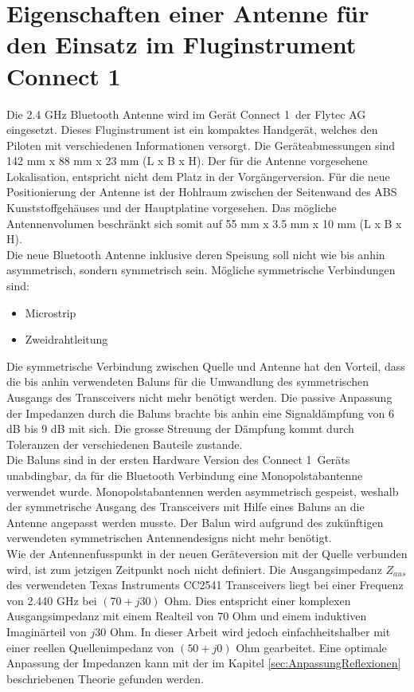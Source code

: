 \section{Eigenschaften einer Antenne für den Einsatz im Fluginstrument \glqq Connect 1\grqq }\label{sec:EigenschaftenAntenne}
Die 2.4 GHz Bluetooth Antenne wird im Gerät \glqq Connect 1\grqq \ der Flytec AG eingesetzt. Dieses Fluginstrument ist ein kompaktes Handgerät, welches den Piloten mit verschiedenen Informationen versorgt. Die Geräteabmessungen sind 142 mm x 88 mm x 23 mm (L x B x H). Der für die Antenne vorgesehene Lokalisation, entspricht nicht dem Platz in der Vorgängerversion. Für die neue Positionierung der Antenne ist der Hohlraum zwischen der Seitenwand des ABS Kunststoffgehäuses und der Hauptplatine vorgesehen. Das mögliche Antennenvolumen beschränkt sich somit auf 55 mm x 3.5 mm x 10 mm (L x B x H).\\
Die neue Bluetooth Antenne inklusive deren Speisung soll nicht wie bis anhin asymmetrisch, sondern symmetrisch sein. Mögliche symmetrische Verbindungen sind:
\begin{itemize}
\item Microstrip 
\item Zweidrahtleitung
\end{itemize}
Die symmetrische Verbindung zwischen Quelle und Antenne hat den Vorteil, dass die bis anhin verwendeten Baluns für die Umwandlung des symmetrischen Ausgangs des Transceivers nicht mehr benötigt werden. Die passive Anpassung der Impedanzen durch die Baluns brachte bis anhin eine Signaldämpfung von 6 dB bis 9 dB mit sich. Die grosse Streuung der Dämpfung kommt durch Toleranzen der verschiedenen Bauteile zustande.\\
Die Baluns sind in der ersten Hardware Version des \glqq Connect 1\grqq \ Geräts unabdingbar, da für die Bluetooth Verbindung eine Monopolstabantenne verwendet wurde. Monopolstabantennen werden asymmetrisch gespeist, weshalb der symmetrische Ausgang des Transceivers mit Hilfe eines Baluns an die Antenne angepasst werden musste. Der Balun wird aufgrund des zukünftigen verwendeten symmetrischen Antennendesigns nicht mehr benötigt.\\
Wie der Antennenfusspunkt in der neuen Geräteversion mit der Quelle verbunden wird, ist zum jetzigen Zeitpunkt noch nicht definiert. Die Ausgangsimpedanz $Z_{aus}$ des verwendeten Texas Instruments CC2541 Transceivers liegt bei einer Frequenz von 2.440 GHz bei $(70+j30)$ Ohm. Dies entspricht einer komplexen Ausgangsimpedanz mit einem Realteil von $70$ Ohm und einem induktiven Imaginärteil von $j30$ Ohm. In dieser Arbeit wird  jedoch einfachheitshalber mit einer reellen Quellenimpedanz von $(50+j0)$ Ohm gearbeitet. Eine optimale Anpassung der Impedanzen kann mit der im Kapitel \ref{sec:AnpassungReflexionen} beschriebenen Theorie gefunden werden.\\
